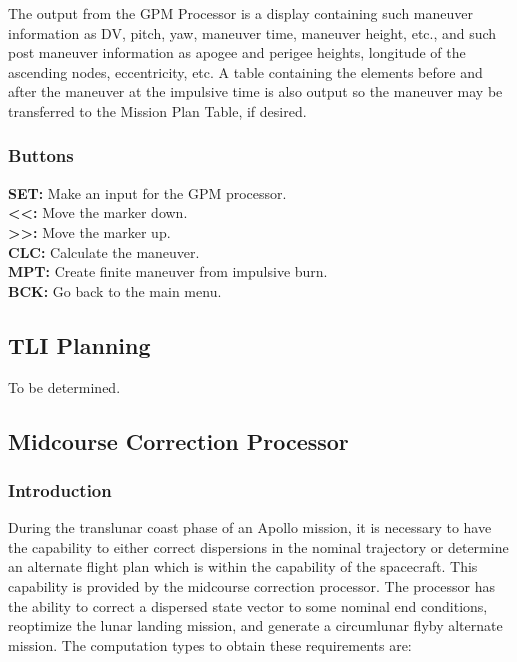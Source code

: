 \documentclass[11pt]{article} %
\begin{document}
The output from the GPM Processor is a display containing such maneuver information as DV, pitch, yaw, maneuver time, maneuver height, etc., and such post maneuver information as apogee and perigee heights, longitude of the ascending nodes, eccentricity, etc. A table containing the elements before and after the maneuver at the impulsive time is also output so the maneuver may be transferred to the Mission Plan Table, if desired.\\

\subsubsection{Buttons}

\textbf{SET:} Make an input for the GPM processor.\\
\textbf{<<:} Move the marker down.\\  
\textbf{>>:} Move the marker up.\\
\textbf{CLC:} Calculate the maneuver.\\
\textbf{MPT:} Create finite maneuver from impulsive burn.\\
\textbf{BCK:} Go back to the main menu.\\

\subsection{TLI Planning}

To be determined.\\
\newpage

\subsection{Midcourse Correction Processor}

\subsubsection{Introduction}

During the translunar coast phase of an Apollo mission, it is necessary to have the capability to either correct dispersions in the nominal trajectory or determine an alternate flight plan which is within the capability of the spacecraft. This capability is provided by the midcourse correction processor. The processor has the ability to correct a dispersed state vector to some nominal end conditions, reoptimize the lunar landing mission, and generate a circumlunar flyby alternate mission. The computation types to obtain these requirements are:
\end{document}
